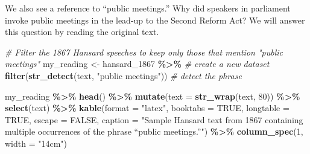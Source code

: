 \documentclass[
]{article}
\newenvironment{Shaded}{\begin{snugshade}}{\end{snugshade}}
\newcommand{\AttributeTok}[1]{\textcolor[rgb]{0.13,0.29,0.53}{#1}}
\newcommand{\CommentTok}[1]{\textcolor[rgb]{0.56,0.35,0.01}{\textit{#1}}}
\newcommand{\ConstantTok}[1]{\textcolor[rgb]{0.56,0.35,0.01}{#1}}
\newcommand{\DecValTok}[1]{\textcolor[rgb]{0.00,0.00,0.81}{#1}}
\newcommand{\FunctionTok}[1]{\textcolor[rgb]{0.13,0.29,0.53}{\textbf{#1}}}
\newcommand{\NormalTok}[1]{#1}
\newcommand{\OtherTok}[1]{\textcolor[rgb]{0.56,0.35,0.01}{#1}}
\newcommand{\SpecialCharTok}[1]{\textcolor[rgb]{0.81,0.36,0.00}{\textbf{#1}}}
\newcommand{\StringTok}[1]{\textcolor[rgb]{0.31,0.60,0.02}{#1}}
\begin{document}
We also see a reference to ``public meetings.'' Why did speakers in
parliament invoke public meetings in the lead-up to the Second Reform
Act? We will answer this question by reading the original text.

\begin{Shaded}
\begin{Highlighting}[]
\CommentTok{\# Filter the 1867 Hansard speeches to keep only those that mention "public meetings"}
\NormalTok{my\_reading }\OtherTok{\textless{}{-}}\NormalTok{ hansard\_1867 }\SpecialCharTok{\%\textgreater{}\%} \CommentTok{\# create a new dataset}
  \FunctionTok{filter}\NormalTok{(}\FunctionTok{str\_detect}\NormalTok{(text, }\StringTok{"public meetings"}\NormalTok{)) }\CommentTok{\# detect the phrase}

\NormalTok{my\_reading }\SpecialCharTok{\%\textgreater{}\%}
  \FunctionTok{head}\NormalTok{() }\SpecialCharTok{\%\textgreater{}\%}
  \FunctionTok{mutate}\NormalTok{(}\AttributeTok{text =} \FunctionTok{str\_wrap}\NormalTok{(text, }\DecValTok{80}\NormalTok{)) }\SpecialCharTok{\%\textgreater{}\%}
  \FunctionTok{select}\NormalTok{(text) }\SpecialCharTok{\%\textgreater{}\%}
  \FunctionTok{kable}\NormalTok{(}\AttributeTok{format =} \StringTok{"latex"}\NormalTok{, }
        \AttributeTok{booktabs =} \ConstantTok{TRUE}\NormalTok{, }
        \AttributeTok{longtable =} \ConstantTok{TRUE}\NormalTok{, }
        \AttributeTok{escape =} \ConstantTok{FALSE}\NormalTok{,}
        \AttributeTok{caption =} \StringTok{"Sample Hansard text from 1867 containing multiple occurrences }
\StringTok{        of the phrase “public meetings.”"}\NormalTok{) }\SpecialCharTok{\%\textgreater{}\%}
  \FunctionTok{column\_spec}\NormalTok{(}\DecValTok{1}\NormalTok{, }\AttributeTok{width =} \StringTok{"14cm"}\NormalTok{)}
\end{Highlighting}
\end{Shaded}
\end{document}
